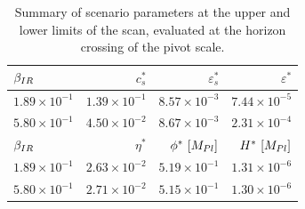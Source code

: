 
\begin{table}[h!]
  \begin{center}
    \begin{tabular}{lrrr}
        \toprule
        $\beta_{IR}$ &    $c_s^{*}$ &  $\varepsilon_s^{*}$ &   $\varepsilon^{*}$ \\
        \midrule
        $1.89\times 10^{-1}$  &  $1.39\times 10^{-1}$  &  $  8.57\times 10^{-3}$  &  $7.44\times 10^{-5}$  \\
        $5.80\times 10^{-1}$  &  $4.50\times 10^{-2}$  &  $  8.67\times 10^{-3}$  &  $2.31\times 10^{-4}$  \\
        \bottomrule
        $\beta_{IR}$ &    $\eta^{*}$ &  $\phi^{*}~[M_{Pl}]$ &     $H^{*}~[M_{Pl}]$ \\
        \midrule
        $1.89\times 10^{-1}$  &  $2.63\times 10^{-2}$ &  $5.19\times 10^{-1}$  &  $1.31\times 10^{-6}$\\
        $5.80\times 10^{-1}$  &  $2.71\times 10^{-2}$ &  $5.15\times 10^{-1}$  &  $1.30\times 10^{-6}$\\
        \bottomrule
    \end{tabular}
    \caption{
        Summary of scenario parameters at the upper and lower limits of the scan, evaluated at the horizon
      crossing of the pivot scale.
      }\label{tab:scan_summary_sr}
  \end{center}
\end{table}



